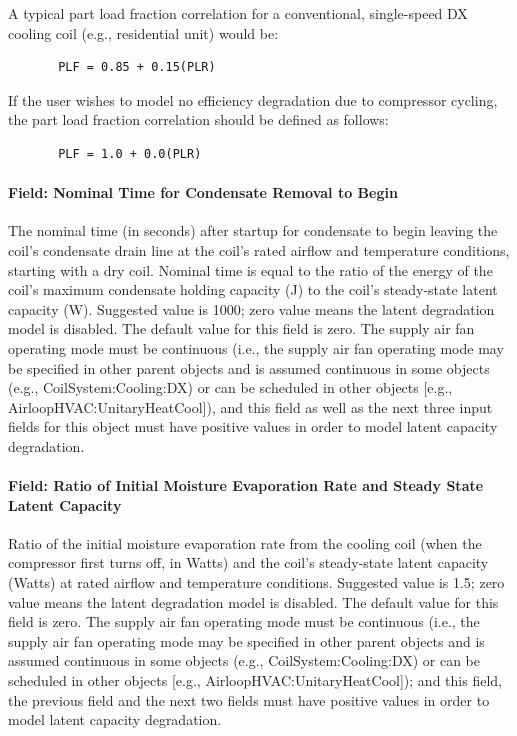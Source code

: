 A typical part load fraction correlation for a conventional, single-speed DX cooling coil (e.g., residential unit) would be:

\begin{lstlisting}
       PLF = 0.85 + 0.15(PLR)
\end{lstlisting}

If the user wishes to model no efficiency degradation due to compressor cycling, the part load fraction correlation should be defined as follows:

\begin{lstlisting}
       PLF = 1.0 + 0.0(PLR)
\end{lstlisting}

\paragraph{Field: Nominal Time for Condensate Removal to Begin}\label{field-nominal-time-for-condensate-removal-to-begin-2}

The nominal time (in seconds) after startup for condensate to begin leaving the coil's condensate drain line at the coil's rated airflow and temperature conditions, starting with a dry coil. Nominal time is equal to the ratio of the energy of the coil's maximum condensate holding capacity (J) to the coil's steady-state latent capacity (W). Suggested value is 1000; zero value means the latent degradation model is disabled. The default value for this field is zero. The supply air fan operating mode must be continuous (i.e., the supply air fan operating mode may be specified in other parent objects and is assumed continuous in some objects (e.g., CoilSystem:Cooling:DX) or can be scheduled in other objects {[}e.g., AirloopHVAC:UnitaryHeatCool{]}), and this field as well as the next three input fields for this object must have positive values in order to model latent capacity degradation.

\paragraph{Field: Ratio of Initial Moisture Evaporation Rate and Steady State Latent Capacity}\label{field-ratio-of-initial-moisture-evaporation-rate-and-steady-state-latent-capacity-2}

Ratio of the initial moisture evaporation rate from the cooling coil (when the compressor first turns off, in Watts) and the coil's steady-state latent capacity (Watts) at rated airflow and temperature conditions. Suggested value is 1.5; zero value means the latent degradation model is disabled. The default value for this field is zero. The supply air fan operating mode must be continuous (i.e., the supply air fan operating mode may be specified in other parent objects and is assumed continuous in some objects (e.g., CoilSystem:Cooling:DX) or can be scheduled in other objects {[}e.g., AirloopHVAC:UnitaryHeatCool{]}); and this field, the previous field and the next two fields must have positive values in order to model latent capacity degradation.

